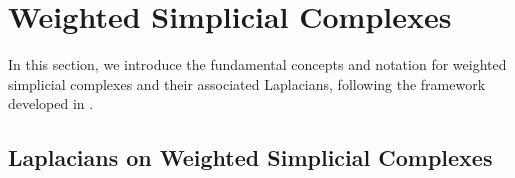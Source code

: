 \documentclass[10pt]{amsart}
\theoremstyle{definition}
\newcommand{\eat}[1]{}
\begin{document}
    
  \eat{ From the inclusion $\sigma( H_p)\subseteq\sigma( H_2)\subseteq[0,\infty)$ we conclude that $\rho( H_p)$ and $\rho( H_q)$ are connected for any $1\leq p,q\leq\infty$. Moreover, $( H_p-z)^{-1}$ and $( H_q-z)^{-1}$ are consistent for all $z,\mathrm{Re}z<0$ as a consequence of the Laplace transform. By \cite[Corollary 1.4]{HempelVoigt1987} they are consistent on $\rho( H_p)\cap\rho( H_q).$ By means of interpolation for $1\leq p<\infty$ and $q$ its dual exponent, we get that $( H_p-z)^{-1}$ extends consistently to an $\ell^2$-bounded operator. This gives us a family of $\ell^2$-bounded operators that is analytic on $\rho( H_p)$ and consistent with $( H_2-z)^{-1}$ for all $z$, $\mathrm{Re}z<0$ and, therefore, on the connected set $\rho( H_p)\cap\rho( H_2).$ 
    As before, since $\rho( H_p)$ is connected,  we conclude from unique continuation that $\rho( H_p)\subseteq\rho( H_2).$}
 

\section{Weighted Simplicial Complexes}\label{s:weighted}
 
 



In this section, we introduce the fundamental concepts and notation for weighted simplicial complexes and their associated Laplacians, following the framework developed in \cite{BK}.

\subsection{Laplacians on Weighted Simplicial Complexes}
 
\end{document}
